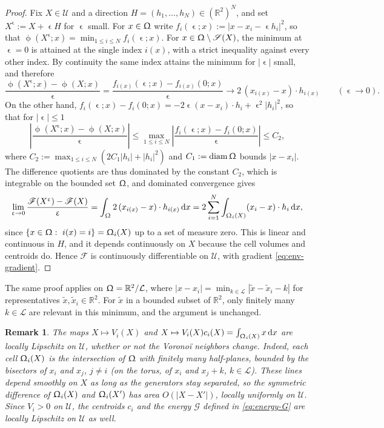 \documentclass[letterpaper,11pt,twoside]{article}
\numberwithin{figure}{section}
\numberwithin{table}{section}
\theoremstyle{cpamplain}
\theoremstyle{cpamdefinition}
\newtheorem{remark}[theorem]{Remark}
\newcommand{\R}{\mathbb{R}}
\newcommand{\diff}{\mathrm{d}}
\let\varepsilon\upvarepsilon
\let\phi\upphi
\let\Omega\Upomega
\renewcommand{\le}{\leqslant}
\numberwithin{equation}{section}
\begin{document}
\begin{proof}
Fix $X\in\mathcal U$ and a direction $H=(h_1,\dots,h_N)\in(\mathbb R^2)^N$, and set $X^\varepsilon:=X+\varepsilon H$ for $\varepsilon$ small.
For $x\in\Omega$ write $f_i(\varepsilon;x):=|x-x_i-\varepsilon h_i|^2$, so that $\phi(X^\varepsilon;x)=\min_{1\le i\le N}f_i(\varepsilon;x)$.
For $x\in\Omega\setminus\mathscr S(X)$, the minimum at $\varepsilon=0$ is attained at the single index $i(x)$, with a strict inequality against every other index.
By continuity the same index attains the minimum for $|\varepsilon|$ small, and therefore
\[
\frac{\phi(X^\varepsilon;x)-\phi(X;x)}{\varepsilon}
=\frac{f_{i(x)}(\varepsilon;x)-f_{i(x)}(0;x)}{\varepsilon}
\longrightarrow2\,(x_{i(x)}-x)\cdot h_{i(x)}
\qquad(\varepsilon\to0).
\]
On the other hand, $f_i(\varepsilon;x)-f_i(0;x)=-2\varepsilon (x-x_i)\cdot h_i + \varepsilon^2|h_i|^2$, so that for $|\varepsilon|\le 1$
\[
\left|\frac{\phi(X^\varepsilon;x)-\phi(X;x)}{\varepsilon}\right|
\le
\max_{1\le i\le N}\left|\frac{f_i(\varepsilon;x)-f_i(0;x)}{\varepsilon}\right|
\le C_2,
\]
where $C_2:=\max_{1\le i\le N}(2C_1|h_i|+|h_i|^2)$ and $C_1:=\operatorname{diam}\Omega$ bounds $|x-x_i|$.
The difference quotients are thus dominated by the constant $C_2$, which is integrable on the bounded set $\Omega$, and dominated convergence gives
\[
\lim_{\varepsilon\to0}\frac{\mathscr F(X^\varepsilon)-\mathscr F(X)}{\varepsilon}
=
\int_\Omega 2\,(x_{i(x)}-x)\cdot h_{i(x)}\,\diff x
=
2\sum_{i=1}^N\int_{\Omega_i(X)} (x_i-x)\cdot h_i\,\diff x,
\]
since $\{x\in\Omega:\ i(x)=i\}=\Omega_i(X)$ up to a set of measure zero.
This is linear and continuous in $H$, and it depends continuously on $X$ because the cell volumes and centroids do.
Hence $\mathscr F$ is continuously differentiable on $\mathcal U$, with gradient \eqref{eq:env-gradient}.
\end{proof}

The same proof applies on $\Omega=\R^2/\mathcal L$, where $|x-x_i|=\min_{k\in\mathcal L}|\tilde x-\tilde x_i-k|$ for representatives $\tilde x,\tilde x_i\in\R^2$. For $\tilde x$ in a bounded subset of $\R^2$, only finitely many $k\in\mathcal L$ are relevant in this minimum, and the argument is unchanged.

\begin{remark}\label{rem:lipschitz}
The maps $X\mapsto V_i(X)$ and $X\mapsto V_i(X)c_i(X)=\int_{\Omega_i(X)}x\,\diff x$ are locally Lipschitz on $\mathcal U$, whether or not the Vorono\"i neighbors change.
Indeed, each cell $\Omega_i(X)$ is the intersection of $\Omega$ with finitely many half-planes, bounded by the bisectors of $x_i$ and $x_j$, $j\ne i$ (on the torus, of $x_i$ and $x_j+k$, $k\in\mathcal L$).
These lines depend smoothly on $X$ as long as the generators stay separated, so the symmetric difference of $\Omega_i(X)$ and $\Omega_i(X')$ has area $O(|X-X'|)$, locally uniformly on $\mathcal U$.
Since $V_i>0$ on $\mathcal U$, the centroids $c_i$ and the energy $\mathscr G$ defined in \eqref{eq:energy-G} are locally Lipschitz on $\mathcal U$ as well.
\end{remark}
\end{document}
